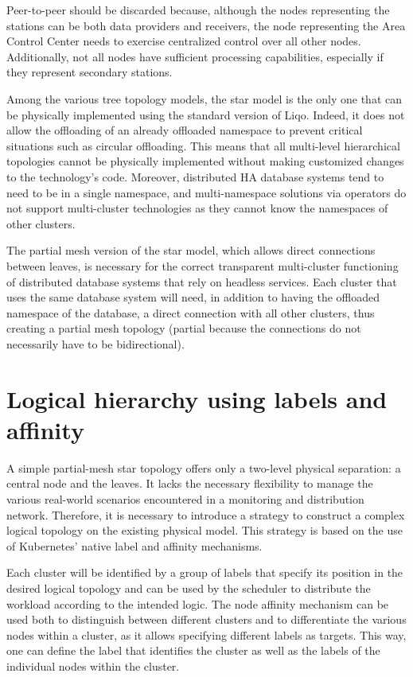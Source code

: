 Peer-to-peer should be discarded because, although the nodes representing the stations can be both data providers and receivers, the node representing the Area Control Center needs to exercise centralized control over all other nodes. Additionally, not all nodes have sufficient processing capabilities, especially if they represent secondary stations.

Among the various tree topology models, the star model is the only one that can be physically implemented using the standard version of Liqo. Indeed, it does not allow the offloading of an already offloaded namespace to prevent critical situations such as circular offloading. This means that all multi-level hierarchical topologies cannot be physically implemented without making customized changes to the technology's code. Moreover, distributed HA database systems tend to need to be in a single namespace, and multi-namespace solutions via operators do not support multi-cluster technologies as they cannot know the namespaces of other clusters.

The partial mesh version of the star model, which allows direct connections between leaves, is necessary for the correct transparent multi-cluster functioning of distributed database systems that rely on headless services. Each cluster that uses the same database system will need, in addition to having the offloaded namespace of the database, a direct connection with all other clusters, thus creating a partial mesh topology (partial because the connections do not necessarily have to be bidirectional).

\section{Logical hierarchy using labels and affinity}
A simple partial-mesh star topology offers only a two-level physical separation: a central node and the leaves. It lacks the necessary flexibility to manage the various real-world scenarios encountered in a monitoring and distribution network. Therefore, it is necessary to introduce a strategy to construct a complex logical topology on the existing physical model. This strategy is based on the use of Kubernetes' native label and affinity mechanisms.

Each cluster will be identified by a group of labels that specify its position in the desired logical topology and can be used by the scheduler to distribute the workload according to the intended logic. The node affinity mechanism can be used both to distinguish between different clusters and to differentiate the various nodes within a cluster, as it allows specifying different labels as targets. This way, one can define the label that identifies the cluster as well as the labels of the individual nodes within the cluster.

